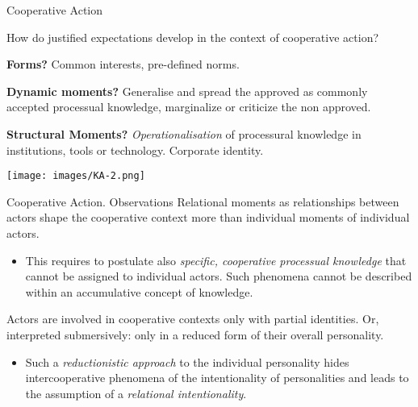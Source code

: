 \documentclass{beamer}
\begin{document}
\begin{frame}{Cooperative Action}

  \begin{minipage}{.5\textwidth}\small
  How do justified expectations develop in the context of cooperative action?
  \vskip8pt
  
\textbf{Forms?} Common interests, pre-defined norms.\vskip8pt

\textbf{Dynamic moments?} Generalise and spread the approved as commonly
accepted processual knowledge, marginalize or criticize the non
approved.  \vskip8pt

\textbf{Structural Moments?}  \emph{Operationa\-lisation} of processural
knowledge in institutions, tools or technology.  Corporate identity.  \vskip8pt
  \end{minipage}
\hfill
  \begin{minipage}{.47\textwidth}
  \begin{center}
    \texttt{[image: images/KA-2.png]}
  \end{center}
  
  \end{minipage}
\end{frame}

\begin{frame}{Cooperative Action. Observations}
Relational moments as relationships between actors shape the cooperative
context more than individual moments of individual actors.\vspace{-1em}
\begin{itemize}
\item This requires to postulate also \emph{specific, cooperative processual
  knowledge} that cannot be assigned to individual actors. Such phenomena
  cannot be described within an accumulative concept of knowledge.
\end{itemize}
Actors are involved in cooperative contexts only with partial identities. Or,
interpreted submersively: only in a reduced form of their overall personality.
\vspace{-1em}
\begin{itemize}
\item Such a \emph{reductionistic approach} to the individual personality
  hides intercooperative phenomena of the intentionality of personalities and
  leads to the assumption of a \emph{relational intentionality}.
\end{itemize}
\end{frame}
\end{document}
